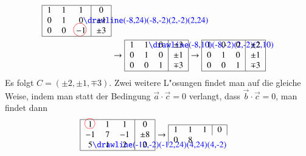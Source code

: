 \begin{beispiel}
\begin{align*}
\begin{tabular}{|>{$}c<{$}>{$}c<{$}>{$}c<{$}|>{$}c<{$}|}
\hline
1&1&1&0\\
0&1&0%
\begin{picture}(0,0)%
\color{blue}\drawline(-8,24)(-8,-2)(2,-2)(2,24)
\end{picture}%
&\pm1\\
0&0&-1%
\begin{picture}(0,0)
\color{red}\put(-7,4){\circle{15}}
\end{picture}%
&\pm3\\
\hline
\end{tabular}
\\
&
\rightarrow
\begin{tabular}{|>{$}c<{$}>{$}c<{$}>{$}c<{$}|>{$}c<{$}|}
\hline
1&1%
\begin{picture}(0,0)%
\color{blue}\drawline(-8,10)(-8,-2)(2,-2)(2,10)
\end{picture}%
&0&\pm3\\
0&1&0&\pm1\\
0&0&1&\mp3\\
\hline
\end{tabular}
\rightarrow
\begin{tabular}{|>{$}c<{$}>{$}c<{$}>{$}c<{$}|>{$}c<{$}|}
\hline
1&0&0&\pm 2\\
0&1&0&\pm1\\
0&0&1&\mp3\\
\hline
\end{tabular}
\end{align*}
Es folgt $C=(\pm 2,\pm1,\mp3)$.
Zwei weitere L"osungen findet
man auf die gleiche Weise, indem man statt der Bedingung $\vec a\cdot\vec c=0$
verlangt, dass $\vec b\cdot\vec c=0$, man findet dann
\begin{align*}
\begin{tabular}{|>{$}c<{$}>{$}c<{$}>{$}c<{$}|>{$}c<{$}|}
\hline
1%
\begin{picture}(0,0)
\color{red}\put(-3,4){\circle{12}}
\end{picture}%
&1&1&0\\
-1&7&-1&\pm8\\
5%
\begin{picture}(0,0)%
\color{blue}\drawline(-12,-2)(-12,24)(4,24)(4,-2)
\end{picture}%
&1&2&0\\
\hline
\end{tabular}
&
\rightarrow
\begin{tabular}{|>{$}c<{$}>{$}c<{$}>{$}c<{$}|>{$}c<{$}|}
\hline
1&1&1&0\\
0&8%
\begin{picture}(0,0)

\end{picture}
\end{tabular}
\end{align*}
\end{beispiel}

